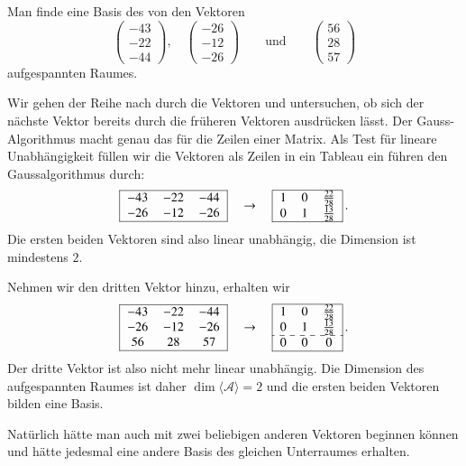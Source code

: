 \begin{beispiel}
Man finde eine Basis des von den Vektoren 
\[
\begin{pmatrix}
  -43\\  -22\\  -44
\end{pmatrix},\quad
\begin{pmatrix}
  -26\\  -12\\  -26
\end{pmatrix}
\qquad\text{und}\qquad
\begin{pmatrix}
   56\\   28\\   57
\end{pmatrix}
\]
aufgespannten Raumes.

\smallskip

{\parindent=0pt Wir} gehen der Reihe nach durch die Vektoren und untersuchen,
ob sich der nächste Vektor bereits durch die früheren Vektoren 
ausdrücken lässt.
Der Gauss-Algorithmus macht genau das für die Zeilen einer Matrix.
Als Test für lineare Unabhängigkeit
füllen wir die Vektoren als Zeilen in ein Tableau ein führen
den Gaussalgorithmus durch:
\[
\begin{tabular}{|>{$}c<{$}>{$}c<{$}>{$}c<{$}|}
\hline
  -43&  -22&  -44\\
  -26&  -12&  -26\\
\hline
\end{tabular}
\quad\rightarrow\quad
\begin{tabular}{|>{$}c<{$}>{$}c<{$}>{$}c<{$}|}
\hline
1&0&\frac{22}{28}\\
0&1&\frac{13}{28}\\
\hline
\end{tabular}\,.
\]
Die ersten beiden Vektoren sind also linear unabhängig, die Dimension
ist mindestens $2$.

Nehmen wir den dritten Vektor hinzu, erhalten wir
\[
\begin{tabular}{|>{$}c<{$}>{$}c<{$}>{$}c<{$}|}
\hline
  -43&  -22&  -44\\
  -26&  -12&  -26\\
   56&   28&   57\\
\hline
\end{tabular}
\quad\rightarrow\quad
\begin{tabular}{|>{$}c<{$}>{$}c<{$}>{$}c<{$}|}
\hline
1&0&\frac{22}{28}\\
0&1&\frac{13}{28}\\
\hdashline
0&0&0\\
\hline
\end{tabular}\,.
\]
Der dritte Vektor ist also nicht mehr linear unabhängig. 
Die Dimension des aufgespannten Raumes ist daher
$\dim\langle\mathcal{A}\rangle=2$ und die ersten
beiden Vektoren bilden eine Basis.

Natürlich hätte man auch mit zwei beliebigen anderen Vektoren
beginnen können und hätte jedesmal eine andere Basis des gleichen
Unterraumes erhalten.
\end{beispiel}



